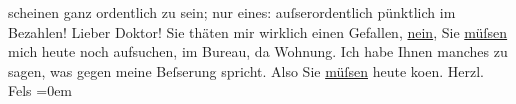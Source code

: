 \begin{ledgroupsized}[t]{13cm}
               scheinen ganz ordentlich zu sein; nur eines: auſserordentlich pünktlich im
               Bezahlen!\pend
           \pstart
           Lieber Doktor! Sie thäten mir wirklich einen Gefallen, \uline{nein}, Sie \uline{müſsen} mich heute noch aufsuchen,
               im Bureau, da{\geminationn} Wohnung. Ich habe Ihnen manches zu sagen,
               was gegen meine Beſserung spricht. Also Sie \uline{müſsen}
               heute ko{\geminationm}en.\pend
           \pstart
           Herzl.{\\[\baselineskip]}\spacefill\mbox{Fels}\pend
           \leftskip=0em{}
         
         \endnumbering{}\end{ledgroupsized}  \newcommand{\dateiname}{L00153}\newcommand{\titel}{Friedrich M. Fels an Arthur Schnitzler, [1. 1. 1893?]}\newcommand{\editorInnen}{Martin Anton Müller und Gerd-Hermann Susen}
      